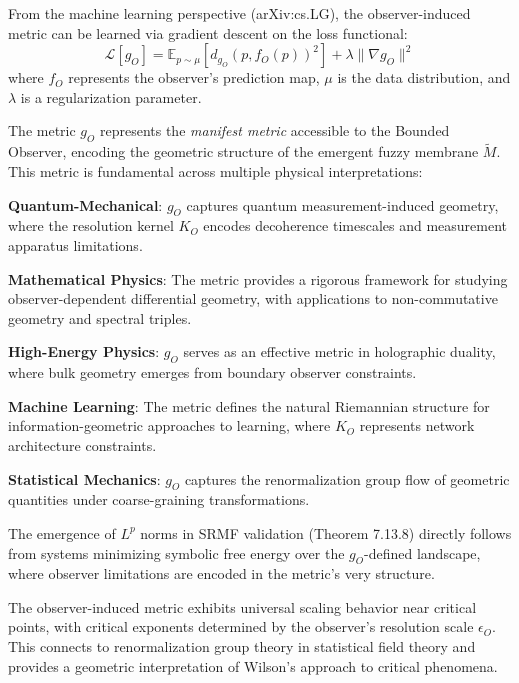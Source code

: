 \begin{theorem}\label{thm:bk4_ml_metric_learning}
From the machine learning perspective (arXiv:cs.LG), the observer-induced metric can be learned via gradient descent on the loss functional:
\begin{equation}
    \mathcal{L}[g_O] = \mathbb{E}_{p \sim \mu} \left[ d_{g_O}(p, f_O(p))^2 \right] + \lambda \|\nabla g_O\|^2
\end{equation}
where $f_O$ represents the observer's prediction map, $\mu$ is the data distribution, and $\lambda$ is a regularization parameter.
\end{theorem}

\begin{scholium}
\label{scholium:bk4_role_of_observer_induced_metric}
The metric $g_O$ represents the \textit{manifest metric} accessible to the Bounded Observer, encoding the geometric structure of the emergent fuzzy membrane $\tilde{M}$. This metric is fundamental across multiple physical interpretations:

\textbf{Quantum-Mechanical}: $g_O$ captures quantum measurement-induced geometry, where the resolution kernel $K_O$ encodes decoherence timescales and measurement apparatus limitations.

\textbf{Mathematical Physics}: The metric provides a rigorous framework for studying observer-dependent differential geometry, with applications to non-commutative geometry and spectral triples.

\textbf{High-Energy Physics}: $g_O$ serves as an effective metric in holographic duality, where bulk geometry emerges from boundary observer constraints.

\textbf{Machine Learning}: The metric defines the natural Riemannian structure for information-geometric approaches to learning, where $K_O$ represents network architecture constraints.

\textbf{Statistical Mechanics}: $g_O$ captures the renormalization group flow of geometric quantities under coarse-graining transformations.

The emergence of $L^p$ norms in SRMF validation (Theorem 7.13.8) directly follows from systems minimizing symbolic free energy over the $g_O$-defined landscape, where observer limitations are encoded in the metric's very structure.
\end{scholium}

\begin{remark}\label{rem:bk4_universality_scaling}
The observer-induced metric exhibits universal scaling behavior near critical points, with critical exponents determined by the observer's resolution scale $\epsilon_O$. This connects to renormalization group theory in statistical field theory and provides a geometric interpretation of Wilson's approach to critical phenomena.
\end{remark}

